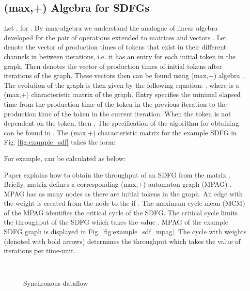 \documentclass[]{eptcs}
\begin{document}
\subsection{(max,+) Algebra for SDFGs}
Let ,  for . By max-algebra we
understand the analogue of linear algebra developed for the pair of operations  extended
to matrices and vectors \cite{2bacc:all}.
Let  denote the vector of production times of tokens that exist in their different channels in between iterations, i.e. it has an entry for each initial token in the graph. Then   denotes the vector of production times of initial tokens after  iterations of the graph. These vectors then can be found using (max,+) algebra \cite{2bacc:all}. The evolution of the graph is then given by the following equation: , where  is a (max,+) characteristic matrix of the graph. Entry  specifies the minimal elapsed time from the production time of the  token in the previous iteration to the production time of the  token in the current iteration. When the  token is not dependent on the  token, then . The specification of the algorithm for obtaining  can be found in \cite{2geil}. The (max,+) characteristic matrix for the example SDFG in Fig. \ref{fig:example_sdf} takes the form:

For example,  can be calculated as below:


Paper \cite{2geil:all} explains how to obtain the throughput of an SDFG from the matrix . Briefly, matrix  defines a corresponding (max,+) automaton graph (MPAG) \cite{2gaub}. MPAG has as many nodes as there are initial tokens in the graph. An edge with the weight  is created from the  node to the  if . The maximum cycle mean (MCM)  of the MPAG identifies the critical cycle of the SDFG. The critical cycle limits the throughput of the SDFG which takes the value . MPAG of the example SDFG graph is displayed in Fig. \ref{fig:example_sdf_mpag}. The cycle with  weights  (denoted with bold arrows) determines the throughput which takes the value of  iterations per time-unit.
\begin{figure}[t]\centering
	~~~~~~~~~~~~~~~
	\caption{Synchronous dataflow}\label{fig:sdf}\end{figure}
\end{document}
